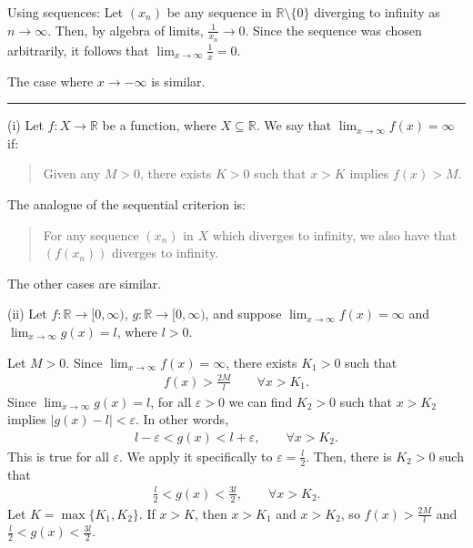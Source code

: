 \documentclass[letterpaper,10pt,english]{jupyterBook}
\begin{document}
\sphinxAtStartPar
Using sequences: Let \((x_n)\) be any sequence in \(\mathbb{R}\setminus\{0\}\) diverging to infinity as \(n\rightarrow\infty\). Then, by algebra of limits, \(\frac{1}{x_n}\rightarrow 0\). Since the sequence was chosen arbitrarily, it follows that \(\lim_{x\rightarrow\infty}\frac{1}{x}=0\).

\sphinxAtStartPar
The case where \(x\to-\infty\) is similar.


\bigskip\hrule\bigskip


\sphinxAtStartPar
{\hyperref[\detokenize{Problems:id12}]{}}
(i) Let \(f:X\to\mathbb{R}\) be a function, where \(X\subseteq\mathbb{R}\). We say that \(\lim_{x \rightarrow \infty} f(x) = \infty\) if:
\begin{quote}

\sphinxAtStartPar
Given any \(M > 0\), there exists \(K > 0\) such that \(x > K\) implies \(f(x) > M\).
\end{quote}

\sphinxAtStartPar
The analogue of the sequential criterion is:
\begin{quote}

\sphinxAtStartPar
For any sequence \((x_{n})\) in \(X\) which diverges to infinity, we also have that \((f(x_{n}))\) diverges to infinity.
\end{quote}

\sphinxAtStartPar
The other cases are similar.

\sphinxAtStartPar
(ii) Let \(f:\mathbb{R}\to[0,\infty)\), \(g:\mathbb{R}\to[0,\infty)\), and suppose \(\displaystyle\lim_{x\rightarrow\infty}f(x)=\infty\) and \(\displaystyle\lim_{x\rightarrow\infty}g(x)=l\), where \(l>0\).

Let \(M > 0\). Since \(\lim_{x\rightarrow\infty}f(x)=\infty\), there exists \(K_1 > 0\) such that
\begin{equation*}
\begin{split}
f(x)>\frac{2M}{l} \hspace{2em} \forall x > K_1.
\end{split}
\end{equation*}
\sphinxAtStartPar
Since \(\lim_{x\rightarrow\infty}g(x)=l\), for all \(\varepsilon>0\) we can find \(K_2>0\) such that \(x>K_2\) implies \(|g(x)-l|<\varepsilon\). In other words,
\begin{equation*}
\begin{split}
l-\varepsilon < g(x) < l+\varepsilon, \hspace{2em} \forall x>K_2.
\end{split}
\end{equation*}
\sphinxAtStartPar
This is true for all \(\varepsilon\). We apply it specifically to \(\varepsilon = \frac{l}{2}\). Then, there is \(K_2>0\) such that
\begin{equation*}
\begin{split}
\frac{l}{2} < g(x) < \frac{3l}{2}, \hspace{2em} \forall x>K_2.
\end{split}
\end{equation*}
\sphinxAtStartPar
Let \(K=\max\{K_1,K_2\}\). If \(x>K\), then \(x>K_1\) and \(x>K_2\), so \(f(x)>\frac{2M}{l}\) and \(\frac{l}{2} < g(x) < \frac{3l}{2}\).
\end{document}
